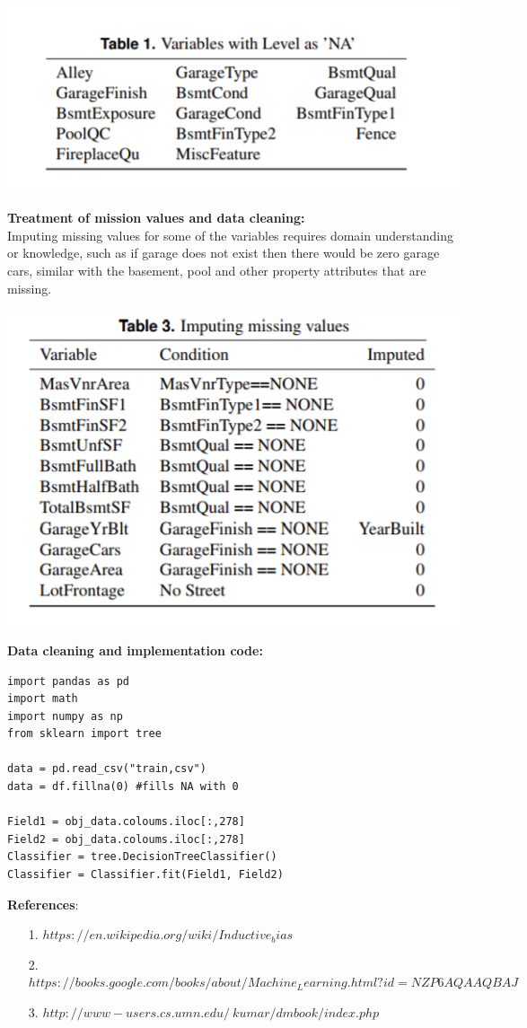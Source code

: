 \documentclass[12pt]{article}
\begin{document}
\begin{enumerate}
\begin{center}
	\includegraphics[width=0.5\columnwidth]{H1} \\
\end{center}

\textbf{Treatment of mission values and data cleaning:} \\

Imputing missing values for some of the variables requires domain understanding or knowledge, such as if garage does not exist then there would be zero garage cars, similar with the basement, pool and other property attributes that are missing. \\

\begin{center}
	\includegraphics[width=0.5\columnwidth]{H2} \\
\end{center}

\textbf{Data cleaning and implementation code:} \\

\begin{verbatim}
import pandas as pd
import math
import numpy as np
from sklearn import tree

data = pd.read_csv("train,csv")
data = df.fillna(0) #fills NA with 0

Field1 = obj_data.coloums.iloc[:,278]
Field2 = obj_data.coloums.iloc[:,278]
Classifier = tree.DecisionTreeClassifier()
Classifier = Classifier.fit(Field1, Field2) 
\end{verbatim}





\end{enumerate}
\textbf{References}:

\begin{itemize}
	
\item[1.] $https://en.wikipedia.org/wiki/Inductive_bias$ \\
	
\item [2.] $https://books.google.com/books/about/Machine_Learning.html?id=NZP6AQAAQBAJ$ \\
	
\item [3.] $http://www-users.cs.umn.edu/~kumar/dmbook/index.php$ \\

\end{itemize}
\end{document}
